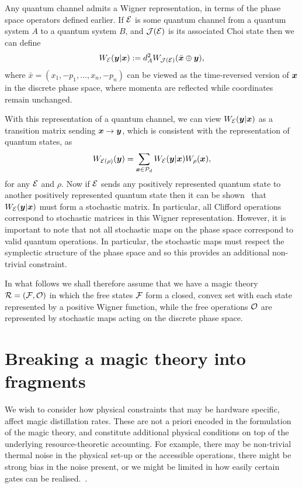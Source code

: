 \documentclass[pra,
aps,
twocolumn,
superscriptaddress,
groupedaddress,
nofootinbib,
reprint
]{revtex4-1}
\begin{document}
Any quantum channel admits a Wigner representation, in terms of the phase space operators defined earlier. If $\mathcal{E}$ is some quantum channel from a quantum system $A$ to a quantum system $B$, and $\mathcal{J}(\mathcal{E})$ is its associated Choi state then we can define
\begin{equation}
W_{\mathcal{E}}(\boldsymbol{y} |\boldsymbol{x}) := d_A^2 W_{\mathcal{J}(\mathcal{E})}(\bar{\boldsymbol{x}} \oplus \boldsymbol{y}),
\end{equation}
where $\bar{x} =(x_1, -p_1, \dots , x_n, -p_n)$ can be viewed as the time-reversed version of $\boldsymbol{x}$ in the discrete phase space, where momenta are reflected while coordinates remain unchanged.

With this representation of a quantum channel, we can view $W_{\mathcal{E}}( \boldsymbol{y} | \boldsymbol{x})$ as a transition matrix sending $\boldsymbol{x} \rightarrow \boldsymbol{y}$, which is consistent with the representation of quantum states, as
\begin{equation}
W_{\mathcal{E}(\rho)} (\boldsymbol{y}) = \sum_{\boldsymbol{x} \in {\mathcal P}_d} W_{\mathcal{E}}( \boldsymbol{y} | \boldsymbol{x}) W_\rho(\boldsymbol{x}),
\end{equation}
for any $\mathcal{E}$ and $\rho$. Now if $\mathcal{E}$ sends any positively represented quantum state to another positively represented quantum state then it can be shown~\cite{Wang_2019} that $W_{\mathcal{E}}(\boldsymbol{y} |\boldsymbol{x})$ must form a stochastic matrix. In particular, all Clifford operations correspond to stochastic matrices in this Wigner representation. However, it is important to note that not all stochastic maps on the phase space correspond to valid quantum operations. In particular, the stochastic maps must respect the symplectic structure of the phase space and so this provides an additional non-trivial constraint.

In what follows we shall therefore assume that we have a magic theory $\mathcal{R} = (\mathcal{F}, \mathcal{O})$ in which the free states $\mathcal{F}$ form a closed, convex set with each state represented by a positive Wigner function, while the free operations $\mathcal{O}$ are represented by stochastic maps acting on the discrete phase space. 


\section{Breaking a magic theory into fragments}
We wish to consider how physical constraints that may be hardware specific, affect magic distillation rates. These are not a priori encoded in the formulation of the magic theory, and constitute additional physical conditions on top of the underlying resource-theoretic accounting. For example, there may be non-trivial thermal noise in the physical set-up or the accessible operations, there might be strong bias in the noise present, or we might be limited in how easily certain gates can be realised.~\cite{Litinski_2019, Babbush_2018, Fowler_2019, Li_2015}.
\end{document}

